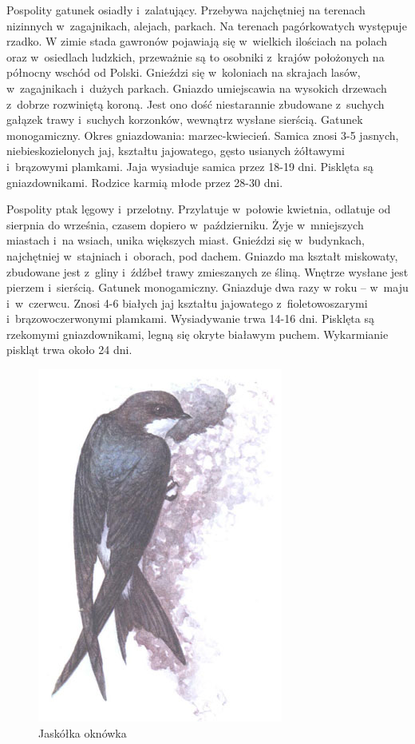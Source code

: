 \documentclass[a4paper,10pt]{report}
\begin{document}
Pospolity gatunek osiadły i~zalatujący. Przebywa najchętniej na terenach nizinnych w~zagajnikach, alejach, parkach. Na terenach pagórkowatych występuje rzadko. W zimie stada gawronów pojawiają się w~wielkich ilościach na polach oraz w~osiedlach ludzkich, przeważnie są to osobniki z~krajów położonych na północny wschód od Polski. Gnieździ się w~koloniach na skrajach lasów, w~zagajnikach i~dużych parkach. Gniazdo umiejscawia na wysokich drzewach z~dobrze rozwiniętą koroną. Jest ono dość niestarannie zbudowane z~suchych gałązek trawy i~suchych korzonków, wewnątrz wysłane sierścią. Gatunek monogamiczny. Okres gniazdowania: marzec-kwiecień. Samica znosi 3-5 jasnych, niebieskozielonych jaj, kształtu jajowatego, gęsto usianych żółtawymi i~brązowymi plamkami. Jaja wysiaduje samica przez 18-19 dni. Pisklęta są gniazdownikami. Rodzice karmią młode przez 28-30 dni. 


Pospolity ptak lęgowy i~przelotny. Przylatuje w~połowie kwietnia, odlatuje od sierpnia do września, czasem dopiero w~październiku. Żyje w~mniejszych miastach i~na wsiach, unika większych miast. Gnieździ się w~budynkach, najchętniej w~stajniach i~oborach, pod dachem. Gniazdo ma kształt miskowaty, zbudowane jest z~gliny i~źdźbeł trawy zmieszanych ze śliną. Wnętrze wysłane jest pierzem i~sierścią. Gatunek monogamiczny. Gniazduje dwa razy w roku -- w~maju i~w~czerwcu. Znosi 4-6 białych jaj kształtu jajowatego z~fioletowoszarymi i~brązowoczerwonymi plamkami. Wysiadywanie trwa 14-16 dni. Pisklęta są rzekomymi gniazdownikami, legną się okryte białawym puchem. Wykarmianie piskląt trwa około 24 dni. 


\begin{figure}[ht]
\centerline{\includegraphics[scale=0.2]{jaskolka-oknowka}}
\caption{Jaskółka oknówka}
\label{fig:jaskolkaoknowka}
\end{figure}
\end{document}
